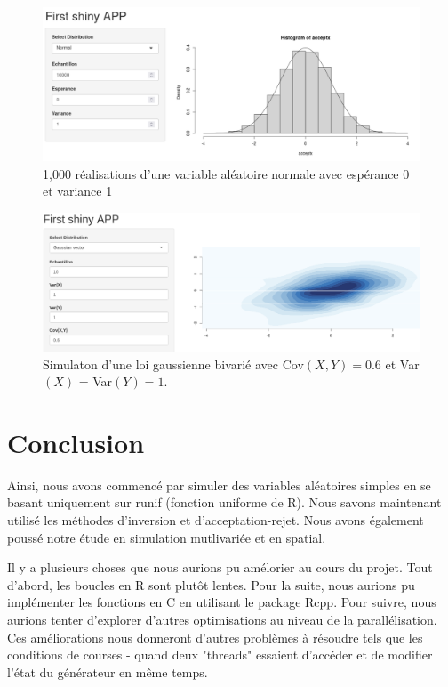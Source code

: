 \documentclass[10pt]{article} %
\begin{document}
\begin{figure}[h!]
\centering
\includegraphics[width=\linewidth]{media/apppic1.png}
\vspace{-5cm}
\caption{1,000 réalisations d'une variable aléatoire normale avec espérance 0 et variance 1}
\end{figure}

\begin{figure}[h!]
\centering
\includegraphics[width=\linewidth]{media/rshiny_gauss.png}
\caption{Simulaton d'une loi gaussienne bivarié avec Cov$(X, Y) = 0.6$ et Var$(X)$ = Var$(Y) = 1$.}
\end{figure}

\section{Conclusion}

Ainsi, nous avons commencé par simuler des variables aléatoires simples en se basant uniquement sur runif (fonction uniforme de R). Nous savons maintenant utilisé les méthodes d'inversion et d'acceptation-rejet. Nous avons également poussé notre étude en simulation mutlivariée et en spatial.

Il y a plusieurs choses que nous aurions pu amélorier au cours du projet.
Tout d'abord, les boucles en R sont plutôt lentes. Pour la suite, nous aurions pu implémenter les fonctions en C en utilisant le package Rcpp. Pour suivre, nous aurions tenter d'explorer d'autres optimisations au niveau de la parallélisation. Ces améliorations nous donneront d'autres problèmes à résoudre tels que les conditions de courses - quand deux "threads" essaient d'accéder et
de modifier l'état du générateur en même temps.
\end{document}
